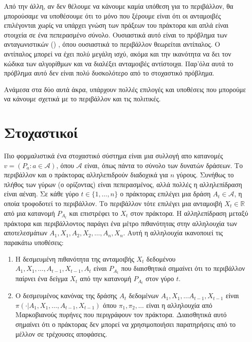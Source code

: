Από την άλλη, αν δεν θέλουμε να κάνουμε καμία υπόθεση για το περιβάλλον, θα μπορούσαμε να υποθέσουμε ότι το μόνο που ξέρουμε είναι ότι οι ανταμοιβές επιλέγονται χωρίς να υπάρχει γνώση των πράξεων του πράκτορα και απλά είναι στοιχεία σε ένα πεπερασμένο σύνολο. Ουσιαστικά αυτό είναι το πρόβλημα των ανταγωνιστικών () , όπου ουσιαστικά το περιβάλλον θεωρείται αντίπαλος. Ο αντίπαλος μπορεί να έχει πολύ μεγάλη ισχύ, ακόμα και την ικανότητα να δει τον κώδικα των αλγορίθμων και να διαλέξει ανταμοιβές αντίστοιχα. Παρ'όλα αυτά το πρόβλημα αυτό δεν είναι πολύ δυσκολότερο από το στοχαστικό πρόβλημα.

Ανάμεσα στα δύο αυτά άκρα, υπάρχουν πολλές επιλογές και υποθέσεις που μπορούμε να κάνουμε σχετικά με το περιβάλλον και τις πολιτικές.

\section{Στοχαστικοί }

Πιο φορμαλιστικά ένα στοχαστικό σύστημα  είναι μια συλλογή απο κατανομές $v = (P_a : a \in \mathcal{A})$, όπου $\mathcal{A}$ είναι, όπως πάντα το σύνολο των δυνατών δράσεων. Το περιβάλλον και ο πράκτορας αλληλεπιδρούν διαδοχικά για $n$ γύρους. Συνήθως το πλήθος των γύρων (ο ορίζοντας) είναι πεπερασμένος, αλλά πολλές η αλληλεπίδραση είναι αέναη. Σε κάθε γύρο $t \in \{1, \ldots, n\}$ ο πράκτορας επιλέγει μια δράση $A_t \in \mathcal{A}$, η οποία τροφοδοτεί το περιβάλλον. Το περιβάλλον τότε επιλέγει μια ανταμοιβή $X_t \in \mathbb{R}$ από μια κατανομή $P_{A_t}$ και επιστρέφει το $X_t$ στον πράκτορα. Η αλληλεπίδραση
μεταξύ πράκτορα και περιβάλλοντος παράγει ένα μέτρο πιθανότητας στην αλληλουχία των αποτελεσμάτων $A_1, X_1, A_2, X_2, \ldots, A_n, X_n$. Αυτή η αλληλουχία ικανοποιεί τις παρακάτω υποθέσεις:

\begin{enumerate}
    \item Η δεσμευμένη πιθανότητα της ανταμοιβής $X_t$ δεδομένου $A_1, X_1, \ldots, A_{t-1}, X_{t-1}, A_t$ είναι $P_{A_t}$ που διαισθητικά σημαίνει ότι το περιβάλλον παίρνει ένα δείγμα $X_t$ από την κατανομή $P_{A_t}$ στον γύρο $t$.
    \item Ο δεσμευμένος κανόνας της δράσης $A_t$ δεδομένων $A_1, X_1, \ldots A_{t-1}, X_{t-1}$ είναι \\$π(\cdot|A_1,X_1, \ldots,A_{t-1},X_{t-1})$ όπου $π_1, π_2, \ldots$ είναι η αλληλουχία από Μαρκοβιανούς πυρήνες που περιγράφουν τον πράκτορα. Διαισθητικά αυτό σημαίνει ότι ο πράκτορας δεν μπορεί να χρησιμοποιήσει παρατηρήσεις από το μέλλον σε τρέχουσες αποφάσεις.
\end{enumerate}

